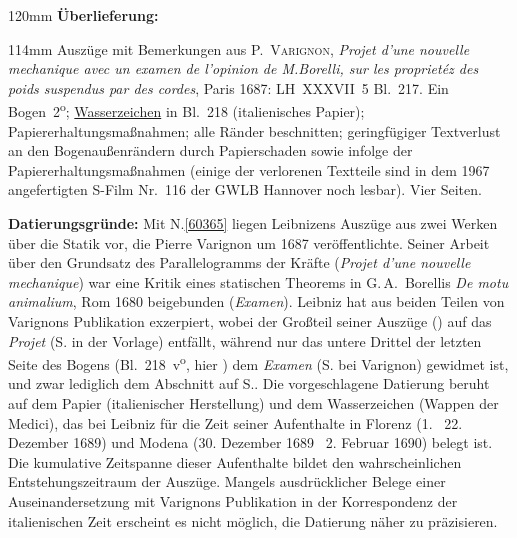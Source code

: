 
\begin{ledgroupsized}[r]{120mm}
\footnotesize
\pstart
\noindent\textbf{Überlieferung:}
\pend
\end{ledgroupsized}
\begin{ledgroupsized}[r]{114mm}
\footnotesize
\pstart
\parindent -6mm
%
Auszüge mit Bemerkungen aus
\textsc{P.~Varignon},
\cite{02028}\textit{Projet d'une nouvelle mechanique avec un examen de l'opinion de M.\;Borelli, sur les proprietéz des poids suspendus par des cordes}, Paris 1687:
LH~XXXVII~5 Bl.~217. 
Ein Bogen~2\textsuperscript{o};
\href{\Scan{LH_37_05_218wz}}%
{Wasserzeichen} in Bl.~218 (italienisches Papier);
Papiererhaltungsmaßnahmen;
alle Ränder beschnitten; geringfügiger Textverlust an den Bogenaußenrändern durch Papierschaden sowie infolge der Papiererhaltungsmaßnahmen
(einige der verlorenen Textteile sind in dem 1967 angefertigten S-Film Nr.~116 der GWLB Hannover noch lesbar).
Vier Seiten.
\pend
\end{ledgroupsized}
\vspace{5mm}
\begin{ledgroup}
\footnotesize
\pstart
\noindent
\textbf{Datierungsgründe:}
Mit N.\;\ref{60365} liegen Leibnizens Auszüge aus zwei \cite{02028}Werken über die Statik vor, die 
Pierre Varignon 
um 1687 veröffentlichte. 
Seiner Arbeit über den Grundsatz des Parallelogramms der Kräfte (\textit{Projet d'une nouvelle mechanique})
war eine Kritik eines statischen Theorems in G.\,A.~Borellis \cite{02099}\textit{De motu animalium}, Rom 1680 beigebunden (\textit{Examen}).
Leibniz hat aus beiden Teilen von Varignons
\cite{02028}Publikation exzerpiert, wobei der Großteil seiner Auszüge () auf das \textit{Projet} (S. in der Vorlage) entfällt, 
während nur das untere Drittel der letzten Seite des Bogens (Bl.~218~v\textsuperscript{o}, hier ) dem \textit{Examen} (S. bei Varignon) gewidmet ist,
und zwar lediglich dem Abschnitt auf S..
\pend
\pstart
Die vorgeschlagene Datierung beruht auf dem Papier (italienischer Herstellung) und dem Wasserzeichen (Wappen der Medici), das bei Leibniz 
für die Zeit seiner Aufenthalte in Florenz (1. \textendash\ 22. Dezember 1689) 
und Modena (30. Dezember 1689 \textendash\ 2. Februar 1690) belegt ist.
Die kumulative Zeitspanne dieser Aufenthalte bildet den wahrscheinlichen Entstehungszeitraum der Auszüge.
Mangels ausdrücklicher Belege einer Auseinandersetzung mit Varignons Publikation in der Korrespondenz der italienischen Zeit erscheint es nicht möglich, die Datierung näher zu präzisieren.
\pend
\end{ledgroup}
